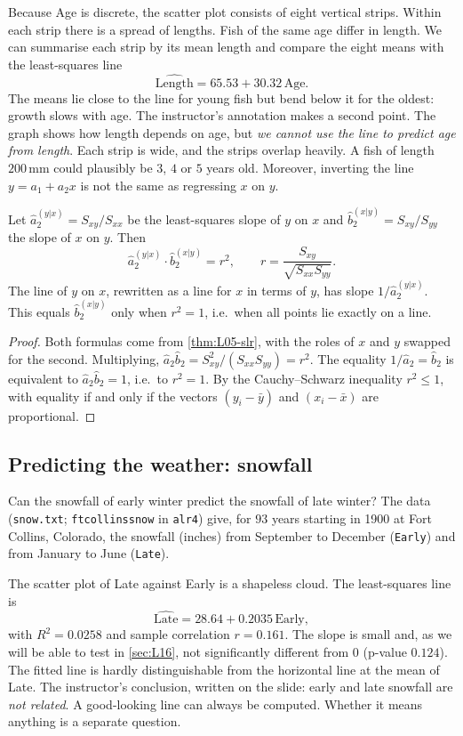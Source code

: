 Because Age is discrete, the scatter plot consists of eight vertical strips. Within each strip
there is a spread of lengths. Fish of the same age differ in length. We can summarise each strip
by its mean length and compare the eight means with the least-squares line
\[
\widehat{\text{Length}} = 65.53 + 30.32\,\text{Age}.
\]
The means lie close to the line for young fish but bend below it for the oldest: growth slows
with age. The instructor's annotation makes a second point. The graph shows how length
depends on age, but \emph{we cannot use the line to predict age from length}. Each strip is wide,
and the strips overlap heavily. A fish of length $200$\,mm could plausibly be $3$, $4$ or $5$
years old. Moreover, inverting the line $y=a_1+a_2x$ is not the same as regressing $x$ on $y$.

\begin{proposition}\label{prop:L07-asym}
Let $\hat a_2^{(y|x)}=S_{xy}/S_{xx}$ be the least-squares slope of $y$ on $x$ and
$\hat b_2^{(x|y)}=S_{xy}/S_{yy}$ the slope of $x$ on $y$. Then
\[
\hat a_2^{(y|x)}\cdot \hat b_2^{(x|y)}=r^2,\qquad r=\frac{S_{xy}}{\sqrt{S_{xx}S_{yy}}} .
\]
The line of $y$ on $x$, rewritten as a line for $x$ in terms of $y$, has slope $1/\hat a_2^{(y|x)}$.
This equals $\hat b_2^{(x|y)}$ only when $r^2=1$, i.e.\ when all points lie exactly on a line.
\end{proposition}
\begin{proof}
Both formulas come from \cref{thm:L05-slr}, with the roles of $x$ and $y$ swapped for the second.
Multiplying, $\hat a_2\hat b_2 = S_{xy}^2/(S_{xx}S_{yy})=r^2$. The equality
$1/\hat a_2=\hat b_2$ is equivalent to $\hat a_2\hat b_2=1$, i.e.\ to $r^2=1$. By the
Cauchy--Schwarz inequality $r^2\le 1$, with equality if and only if the vectors
$(y_i-\bar y)$ and $(x_i-\bar x)$ are proportional.
\end{proof}

\subsection{Predicting the weather: snowfall}
\begin{example}\label{ex:L07-snow}
Can the snowfall of early winter predict the snowfall of late winter? The data (\texttt{snow.txt};
\texttt{ftcollinssnow} in \texttt{alr4}) give, for $93$ years starting in 1900 at Fort Collins,
Colorado, the snowfall (inches) from September to December (\texttt{Early}) and from January to
June (\texttt{Late}).
\end{example}
The scatter plot of Late against Early is a shapeless cloud. The least-squares line is
\[
\widehat{\text{Late}} = 28.64 + 0.2035\,\text{Early},
\]
with $R^2=0.0258$ and sample correlation $r=0.161$. The slope is small and, as we will be able to
test in \cref{sec:L16}, not significantly different from $0$ (p-value $0.124$). The fitted line
is hardly distinguishable from the horizontal line at the mean of Late. The instructor's
conclusion, written on the slide: early and late snowfall are \emph{not related}.
A good-looking line can always be computed. Whether it means anything is a separate question.

